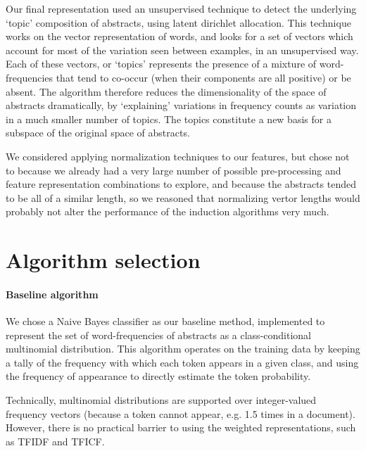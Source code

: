 \documentclass[conference,letterpaper]{IEEEtran}
\begin{document}
Our final representation used an unsupervised technique to detect the
underlying `topic' composition of abstracts, using latent dirichlet allocation.
This technique works on the vector representation of words, and looks for
a set of vectors which account for most of the variation seen between examples,
in an unsupervised way.  Each of these vectors, or `topics' represents the
presence of a mixture of word-frequencies that tend to co-occur (when their
components are all positive) or be absent.  The algorithm therefore reduces
the dimensionality of the space of abstracts dramatically, by `explaining'
variations in frequency counts as variation in a much smaller number of 
topics.  The topics constitute a new basis for a subspace of the original
space of abstracts.

We considered applying normalization techniques to our features, but chose
not to because we already had a very large number of possible pre-processing
and feature representation combinations to explore, and because the abstracts
tended to be all of a similar length, so we reasoned that normalizing vertor 
lengths would probably not alter the performance of the induction algorithms 
very much.

\section{Algorithm selection}
\paragraph{Baseline algorithm}
We chose a Naive Bayes classifier as our baseline method, implemented to 
represent the set of word-frequencies of abstracts as a class-conditional 
multinomial distribution.  This algorithm operates on the training data
by keeping a tally of the frequency with which each token appears in a given
class, and using the frequency of appearance to directly estimate the 
token probability.

Technically, multinomial distributions are supported over integer-valued
frequency vectors (because a token cannot appear, e.g. 1.5 times in a 
document).  However, there is no practical barrier to using the weighted
representations, such as TFIDF and TFICF.
\end{document}
